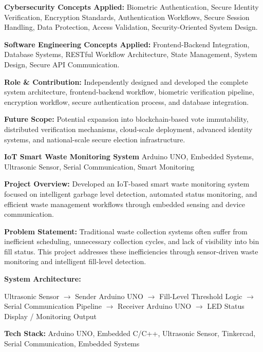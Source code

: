 \documentclass[a4paper,11pt]{article}
\newcommand{\resumeProject}[2]{
\textbf{#1} \hfill {\small #2}
}
\begin{document}
\textbf{Cybersecurity Concepts Applied:}
Biometric Authentication, Secure Identity Verification, Encryption Standards, Authentication Workflows, Secure Session Handling, Data Protection, Access Validation, Security-Oriented System Design.

\textbf{Software Engineering Concepts Applied:}
Frontend-Backend Integration, Database Systems, RESTful Workflow Architecture, State Management, System Design, Secure API Communication.

\textbf{Role \& Contribution:}
Independently designed and developed the complete system architecture, frontend-backend workflow, biometric verification pipeline, encryption workflow, secure authentication process, and database integration.

\textbf{Future Scope:}
Potential expansion into blockchain-based vote immutability, distributed verification mechanisms, cloud-scale deployment, advanced identity systems, and national-scale secure election infrastructure.




\resumeProject
{IoT Smart Waste Monitoring System}
{Arduino UNO, Embedded Systems, Ultrasonic Sensor, Serial Communication, Smart Monitoring}

\textbf{Project Overview:}
Developed an IoT-based smart waste monitoring system focused on intelligent garbage level detection, automated status monitoring, and efficient waste management workflows through embedded sensing and device communication.

\textbf{Problem Statement:}
Traditional waste collection systems often suffer from inefficient scheduling, unnecessary collection cycles, and lack of visibility into bin fill status. This project addresses these inefficiencies through sensor-driven waste monitoring and intelligent fill-level detection.

\textbf{System Architecture:}

Ultrasonic Sensor
$\rightarrow$ Sender Arduino UNO
$\rightarrow$ Fill-Level Threshold Logic
$\rightarrow$ Serial Communication Pipeline
$\rightarrow$ Receiver Arduino UNO
$\rightarrow$ LED Status Display / Monitoring Output

\textbf{Tech Stack:}
Arduino UNO, Embedded C/C++, Ultrasonic Sensor, Tinkercad, Serial Communication, Embedded Systems
\end{document}
